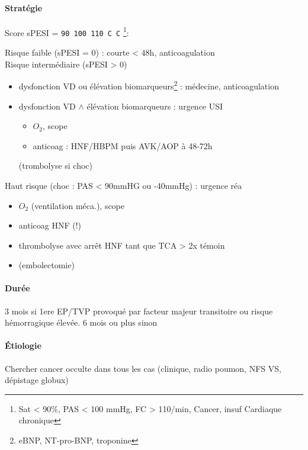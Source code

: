 \documentclass[11pt]{article}
\begin{document}
\paragraph{Stratégie}
\label{sec:org707a6a1}
Score sPESI = \texttt{90 100 110 C C} \footnote{Sat < 90\%, PAS < 100 mmHg, FC > 110/min, Cancer, insuf Cardiaque chronique}:

Risque faible (sPESI = 0) : \faHospital{} courte < 48h, anticoagulation\\
Risque intermédiaire (sPESI > 0)

\begin{itemize}
\item dysfonction VD ou élévation biomarqueurs\footnote{eBNP, NT-pro-BNP, troponine} : \faHospital{}
médecine, anticoagulation
\item dysfonction VD \(\wedge\) élévation biomarqueurs : urgence \danger{}
\thus USI

\begin{itemize}
\item \(O_2\), scope
\item anticoag : HNF/HBPM puis AVK/AOP à 48-72h\\
\end{itemize}
(trombolyse si choc)
\end{itemize}



Haut risque (choc : PAS < 90mmHG ou -40mmHg) : urgence  \thus réa

\begin{itemize}
\item \(O_2\) (ventilation méca.), scope
\item anticoag HNF (!)
\item thrombolyse avec arrêt HNF tant que TCA > 2x témoin
\item (embolectomie)
\end{itemize}


\paragraph{Durée}
\label{sec:org17c8ff0}
3 mois si 1ere EP/TVP provoqué par facteur majeur transitoire ou risque
hémorragique élevée. 6 mois ou plus sinon

\paragraph{Étiologie}
\label{sec:org142300e}
Chercher cancer occulte dans tous les cas (clinique, radio poumon, NFS VS,
dépistage globux)
\end{document}
